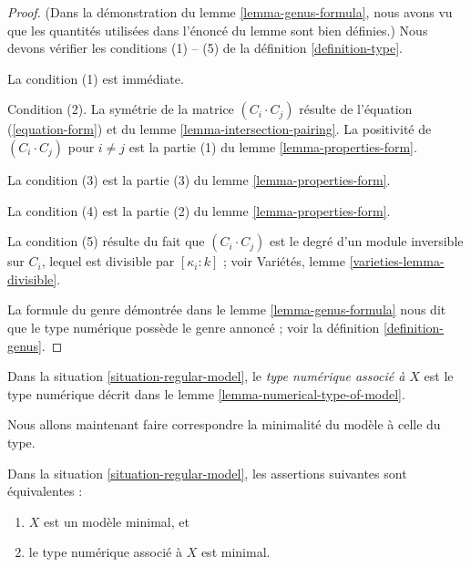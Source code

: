 \begin{proof}
(Dans la démonstration du lemme \ref{lemma-genus-formula},
nous avons vu que les quantités
utilisées dans l'énoncé du lemme sont bien définies.)
Nous devons vérifier les conditions (1) -- (5) de la
définition \ref{definition-type}.

\medskip\noindent
La condition (1) est immédiate.

\medskip\noindent
Condition (2). La symétrie de la matrice $(C_i \cdot C_j)$ résulte de
l'équation (\ref{equation-form}) et du
lemme \ref{lemma-intersection-pairing}.
La positivité de $(C_i \cdot C_j)$ pour $i \not = j$
est la partie (1) du lemme \ref{lemma-properties-form}.

\medskip\noindent
La condition (3) est la partie (3) du lemme \ref{lemma-properties-form}.

\medskip\noindent
La condition (4) est la partie (2) du lemme \ref{lemma-properties-form}.

\medskip\noindent
La condition (5) résulte du fait que $(C_i \cdot C_j)$ est
le degré d'un module inversible sur $C_i$, lequel est divisible
par $[\kappa_i : k]$ ; voir Variétés, lemme \ref{varieties-lemma-divisible}.

\medskip\noindent
La formule du genre démontrée dans le lemme \ref{lemma-genus-formula}
nous dit que le type numérique possède le genre annoncé ; voir la
définition \ref{definition-genus}.
\end{proof}

\begin{definition}
\label{definition-numerical-type-model}
Dans la situation \ref{situation-regular-model}, le
{\it type numérique associé à $X$} est le type numérique
décrit dans le lemme \ref{lemma-numerical-type-of-model}.
\end{definition}

\noindent
Nous allons maintenant faire correspondre la minimalité du modèle à celle du type.

\begin{lemma}
\label{lemma-numerical-type-minimal-model}
Dans la situation \ref{situation-regular-model}, les assertions suivantes
sont équivalentes :
\begin{enumerate}
\item $X$ est un modèle minimal, et
\item le type numérique associé à $X$ est minimal.
\end{enumerate}
\end{lemma}

